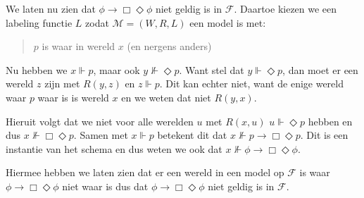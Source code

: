 \documentclass[a4paper,11pt]{article}
\begin{document}
\begin{description}
We laten nu zien dat $\phi \rightarrow \Box \Diamond \phi$ niet geldig is in
$\mathcal{F}$. Daartoe kiezen we een labeling functie $L$ zodat
$\mathcal{M} = (W, R, L)$ een model is met:
\begin{quote}
$p$ is waar in wereld $x$ (en nergens anders)
\end{quote}

Nu hebben we $x \Vdash p$, maar ook $y \not \Vdash \Diamond p$. Want stel dat
$y \Vdash \Diamond p$, dan moet er een wereld $z$ zijn met $R(y, z)$ en
$z \Vdash p$. Dit kan echter niet, want de enige wereld waar $p$ waar is is
wereld $x$ en we weten dat niet $R(y, x)$.

Hieruit volgt dat we niet voor alle werelden $u$ met $R(x, u)$
$u \Vdash \Diamond p$ hebben en dus $x \not \Vdash \Box \Diamond p$. Samen met
$x \Vdash p$ betekent dit dat $x \not \Vdash p \rightarrow \Box \Diamond p$.
Dit is een instantie van het schema en dus weten we ook dat
$x \not \Vdash \phi \rightarrow \Box \Diamond \phi$.

Hiermee hebben we laten zien dat er een wereld in een model op $\mathcal{F}$
is waar $\phi \rightarrow \Box \Diamond \phi$ niet waar is dus dat
$\phi \rightarrow \Box \Diamond \phi$ niet geldig is in $\mathcal{F}$.

\end{description}
\end{document}

